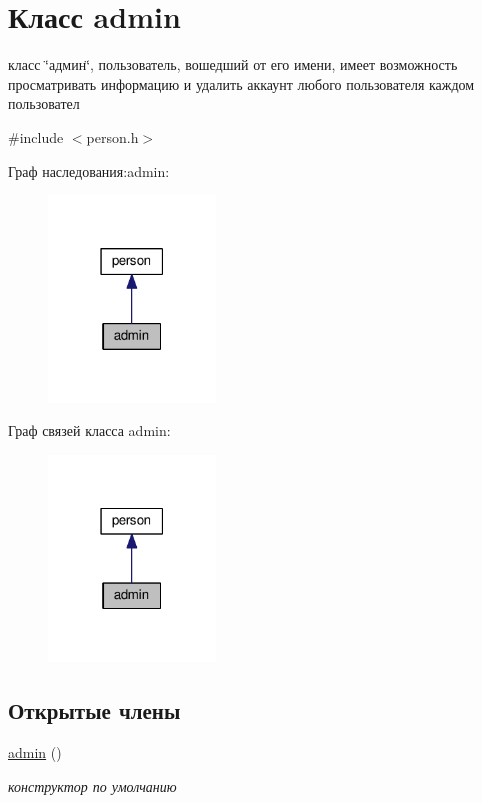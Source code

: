 \hypertarget{classadmin}{\section{Класс admin}
\label{classadmin}
}


класс \char`\"{}админ\char`\"{}, пользователь, вошедший от его имени, имеет возможность просматривать информацию и удалить аккаунт любого пользователя каждом пользовател  




{\ttfamily \#include $<$person.\-h$>$}



Граф наследования\-:admin\-:\nopagebreak
\begin{figure}[H]
\begin{center}
\leavevmode
\includegraphics[width=126pt]{classadmin__inherit__graph}
\end{center}
\end{figure}


Граф связей класса admin\-:\nopagebreak
\begin{figure}[H]
\begin{center}
\leavevmode
\includegraphics[width=126pt]{classadmin__coll__graph}
\end{center}
\end{figure}
\subsection*{Открытые члены}
\begin{DoxyCompactItemize}
\item 
\hyperlink{classadmin_a3460b71933fcd5a46ba70336a87f8407}{admin} ()
\begin{DoxyCompactList}\small\item\em конструктор по умолчанию \end{DoxyCompactList}\end{DoxyCompactItemize}
